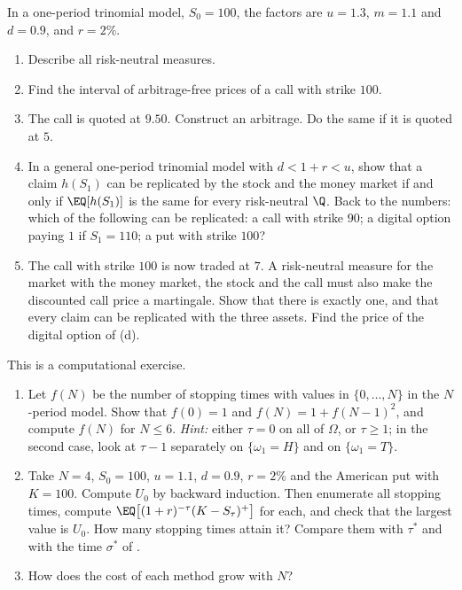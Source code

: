 \begin{exercise}\label{ex:bin-trinomial}
\medium In a one-period trinomial model, $S_0=100$, the factors are $u=1.3$, $m=1.1$ and
$d=0.9$, and $r=2\%$.
\begin{enumerate}[label=(\alph*)]
  \item Describe all risk-neutral measures.
  \item Find the interval of arbitrage-free prices of a call with strike $100$.
  \item The call is quoted at $9.50$. Construct an arbitrage. Do the same if it is quoted
    at $5$.
  \item In a general one-period trinomial model with $d<1+r<u$, show that a claim
    $h(S_1)$ can be replicated by the stock and the money market if and only if
    $\EQ[h(S_1)]$ is the same for every risk-neutral $\Q$. Back to the numbers: which of
    the following can be replicated: a call with strike $90$; a digital option paying $1$
    if $S_1=110$; a put with strike $100$?
  \item The call with strike $100$ is now traded at $7$. A risk-neutral measure for the market with the
    money market, the stock and the call must also make the discounted call price a
    martingale. Show that there is exactly one, and that every claim can be replicated
    with the three assets. Find the price of the digital option of (d).
\end{enumerate}
\end{exercise}

\begin{exercise}\label{ex:bin-stopping-count}
\medium This is a computational exercise.
\begin{enumerate}[label=(\alph*)]
  \item Let $f(N)$ be the number of stopping times with values in $\{0,\dots,N\}$ in the
    $N$-period model. Show that $f(0)=1$ and $f(N)=1+f(N-1)^2$, and compute $f(N)$ for
    $N\le6$. \emph{Hint:} either $\tau=0$ on all of $\Omega$, or $\tau\ge1$; in the second
    case, look at $\tau-1$ separately on $\{\omega_1=H\}$ and on $\{\omega_1=T\}$.
  \item Take $N=4$, $S_0=100$, $u=1.1$, $d=0.9$, $r=2\%$ and the American put with
    $K=100$. Compute $U_0$ by backward induction. Then enumerate all stopping times,
    compute $\EQ\big[(1+r)^{-\tau}(K-S_\tau)^+\big]$ for each, and check that the largest
    value is $U_0$. How many stopping times attain it? Compare them with $\tau^*$ and with
    the time $\sigma^*$ of .
  \item How does the cost of each method grow with $N$?
\end{enumerate}
\end{exercise}
